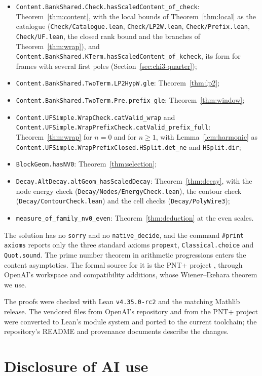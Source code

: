 \documentclass[11pt]{amsart}
\theoremstyle{definition}
\theoremstyle{remark}
\numberwithin{equation}{section}
\newcommand{\lean}[1]{\nolinkurl{#1}}
\begin{document}
\begin{itemize}
\item \lean{Content.BankShared.Check.hasScaledContent_of_check}: Theorem~\ref{thm:content}, with the local bounds of
 Theorem~\ref{thm:local} as the catalogue (\lean{Check/Catalogue.lean}, \lean{Check/LP2W.lean}, \lean{Check/Prefix.lean},
 \lean{Check/UF.lean}, the closed rank bound and the branches of Theorem~\ref{thm:wrap}), and \lean{Content.BankShared.KTerm.hasScaledContent_of_kcheck}, its form
 for frames with several first poles (Section~\ref{sec:chi3-quarter});
\item \lean{Content.BankShared.TwoTerm.LP2HypW.gle}: Theorem~\ref{thm:lp2};
\item \lean{Content.BankShared.TwoTerm.Pre.prefix_gle}: Theorem~\ref{thm:window};
\item \lean{Content.UFSimple.WrapCheck.catValid_wrap} and \lean{Content.UFSimple.WrapPrefixCheck.catValid_prefix_full}:
 Theorem~\ref{thm:wrap} for $n=0$ and for $n\ge1$, with Lemma~\ref{lem:harmonic} as
 \lean{Content.UFSimple.WrapPrefixClosed.HSplit.det_ne} and \lean{HSplit.dir};
\item \lean{BlockGeom.hasNV0}: Theorem~\ref{thm:selection};
\item \lean{Decay.AltDecay.altGeom_hasScaledDecay}: Theorem~\ref{thm:decay}, with the node energy check
 (\lean{Decay/Nodes/EnergyCheck.lean}), the contour check (\lean{Decay/ContourCheck.lean}) and the cell checks
 (\lean{Decay/PolyWire3});
\item \lean{measure_of_family_nv0_even}: Theorem~\ref{thm:deduction} at the even scales.
\end{itemize}
The solution has no \lean{sorry} and no \lean{native_decide}, and the command \texttt{\#print axioms} reports only the
three standard axioms \lean{propext}, \lean{Classical.choice} and \lean{Quot.sound}. The prime number theorem in arithmetic
progressions enters the content asymptotics. The formal source for it is the PNT+ project \cite{PNTPlus}, through
OpenAI's workspace and compatibility additions, whose Wiener--Ikehara theorem we use.

The proofs were checked with Lean \texttt{v4.35.0-rc2} and the matching Mathlib release. The vendored files from OpenAI's
repository and from the PNT+ project were converted to Lean's module system and ported to the current toolchain; the
repository's README and provenance documents describe the changes.

\section*{Disclosure of AI use}
\end{document}
